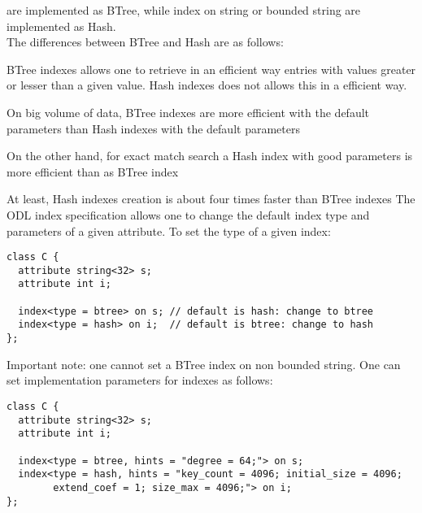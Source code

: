 are implemented as BTree, while index on string or bounded string are
implemented as Hash.
\\
The differences between BTree and Hash are as follows:
\bi
\item BTree indexes allows one to retrieve in an efficient way
entries with values greater or lesser than a given value. Hash indexes
does not allows this in a efficient way.
\item On big volume of data, BTree indexes are more efficient 
with the default parameters than Hash indexes with the default parameters
\item On the other hand, for exact match search a Hash index
with good parameters is more efficient than as BTree index
\item At least, Hash indexes creation is about four times faster
than BTree indexes
\ei
The ODL index specification allows one to change the default index
type and parameters of a given attribute.
To set the type of a given index:
\begin{verbatim}
class C {
  attribute string<32> s;
  attribute int i;

  index<type = btree> on s; // default is hash: change to btree
  index<type = hash> on i;  // default is btree: change to hash
};
\end{verbatim}
Important note: one cannot set a BTree index on non bounded string.
One can set implementation parameters for indexes as follows:
\begin{verbatim}
class C {
  attribute string<32> s;
  attribute int i;

  index<type = btree, hints = "degree = 64;"> on s;
  index<type = hash, hints = "key_count = 4096; initial_size = 4096;
        extend_coef = 1; size_max = 4096;"> on i;
};
\end{verbatim}


